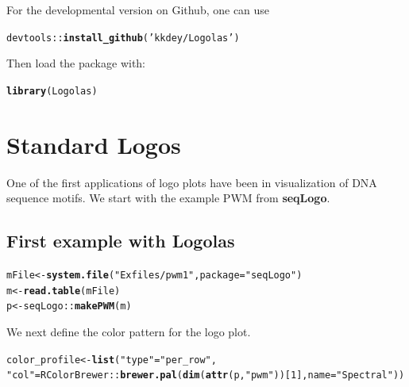 \documentclass[12pt]{article}\usepackage[]{graphicx}\usepackage[usenames,dvipsnames]{color}
\makeatletter
\newcommand{\hlnum}[1]{\textcolor[rgb]{0.686,0.059,0.569}{#1}}%
\newcommand{\hlstr}[1]{\textcolor[rgb]{0.192,0.494,0.8}{#1}}%
\newcommand{\hlopt}[1]{\textcolor[rgb]{0,0,0}{#1}}%
\newcommand{\hlstd}[1]{\textcolor[rgb]{0.345,0.345,0.345}{#1}}%
\newcommand{\hlkwb}[1]{\textcolor[rgb]{0.69,0.353,0.396}{#1}}%
\newcommand{\hlkwc}[1]{\textcolor[rgb]{0.333,0.667,0.333}{#1}}%
\newcommand{\hlkwd}[1]{\textcolor[rgb]{0.737,0.353,0.396}{\textbf{#1}}}%
\newenvironment{kframe}{%
 \def\at@end@of@kframe{}%
 \ifinner\ifhmode%
  \def\at@end@of@kframe{\end{minipage}}%
  \begin{minipage}{\columnwidth}%
 \fi\fi%
 \def\FrameCommand##1{\hskip\@totalleftmargin \hskip-\fboxsep
 \colorbox{shadecolor}{##1}\hskip-\fboxsep
     \hskip-\linewidth \hskip-\@totalleftmargin \hskip\columnwidth}%
 \MakeFramed {\advance\hsize-\width
   \@totalleftmargin\z@ \linewidth\hsize
   \@setminipage}}%
 {\par\unskip\endMakeFramed%
 \at@end@of@kframe}
\newenvironment{knitrout}{}{} %
\makeatother
\begin{document}
For the developmental version on Github, one can use

\begin{knitrout}
\color{fgcolor}\begin{kframe}
\begin{alltt}
\hlstd{devtools}\hlopt{::}\hlkwd{install_github}\hlstd{(}\hlstr{'kkdey/Logolas'}\hlstd{)}
\end{alltt}
\end{kframe}
\end{knitrout}

Then load the package with:

\begin{knitrout}
\color{fgcolor}\begin{kframe}
\begin{alltt}
\hlkwd{library}\hlstd{(Logolas)}
\end{alltt}
\end{kframe}
\end{knitrout}

\section{Standard Logos}

One of the first applications of logo plots have been in visualization of DNA sequence motifs. We start with the example PWM from \textbf{seqLogo}.

\subsection{First example with Logolas}

\begin{knitrout}
\color{fgcolor}\begin{kframe}
\begin{alltt}
\hlstd{mFile} \hlkwb{<-} \hlkwd{system.file}\hlstd{(}\hlstr{"Exfiles/pwm1"}\hlstd{,} \hlkwc{package}\hlstd{=}\hlstr{"seqLogo"}\hlstd{)}
\hlstd{m} \hlkwb{<-} \hlkwd{read.table}\hlstd{(mFile)}
\hlstd{p} \hlkwb{<-} \hlstd{seqLogo}\hlopt{::}\hlkwd{makePWM}\hlstd{(m)}
\end{alltt}
\end{kframe}
\end{knitrout}

We next define the color pattern for the logo plot.

\begin{knitrout}
\color{fgcolor}\begin{kframe}
\begin{alltt}
\hlstd{color_profile} \hlkwb{<-} \hlkwd{list}\hlstd{(}\hlstr{"type"} \hlstd{=} \hlstr{"per_row"}\hlstd{,}
\hlstr{"col"} \hlstd{= RColorBrewer}\hlopt{::}\hlkwd{brewer.pal}\hlstd{(}\hlkwd{dim}\hlstd{(}\hlkwd{attr}\hlstd{(p,} \hlstr{"pwm"}\hlstd{))[}\hlnum{1}\hlstd{],}\hlkwc{name} \hlstd{=}\hlstr{"Spectral"}\hlstd{))}
\end{alltt}
\end{kframe}
\end{knitrout}
\end{document}
